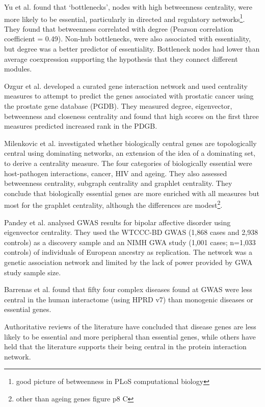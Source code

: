 Yu et al.\cite{yu2007importance} found that `bottlenecks', nodes with high betweenness centrality, were more likely to be essential, particularly in directed and regulatory networks\footnote{good picture of betweenness in PLoS computational biology}. They found that betweenness correlated with degree (Pearson correlation coefficient = 0.49). Non-hub bottlenecks,  were also associated with essentiality, but degree was a better predictor of essentiality. Bottleneck nodes had lower than average coexpression supporting the hypothesis that they connect different modules.

Ozgur et al.\cite{ozgur2008identifying} developed a curated gene interaction network and used centrality measures to attempt to predict the genes associated with prostatic cancer using the prostate gene database (PGDB). They measured degree, eigenvector, betweenness and closeness centrality and found that high scores on the first three measures predicted increased rank in the PDGB.

Milenkovic et al.\cite{milenkovic2011dominating} investigated whether biologically central genes are topologically central using dominating networks, an extension of the idea of a dominating set, to derive a centrality measure. The four categories of biologically essential were host-pathogen interactions, cancer, HIV and ageing. They also assessed betweenness centrality, subgraph centrality and graphlet centrality. They conclude that biologically essential genes are more enriched with all measures but most for the graphlet centrality, although the differences are modest\footnote{other than ageing genes figure p8 C}.  

Pandey et al.\cite{pandey2012epistasis} analysed GWAS results for bipolar affective disorder using eigenvector centrality. They used the WTCCC-BD GWAS (1,868 cases and 2,938 controls) as a discovery sample and an NIMH GWA study (1,001 cases; n=1,033 controls) of individuals of European ancestry as replication. The network was a genetic association network and limited by the lack of power provided by GWA study sample size.

Barrenas et al. \cite{barrenas2009network} found that fifty four complex diseases found at GWAS\cite{hindorff2009potential} were less central in the human interactome (using HPRD v7\cite{keshava2009human}) than monogenic diseases or essential genes. 

Authoritative reviews of the literature have concluded that disease genes are less likely to be essential\cite{barabasi2011network} and more peripheral than essential genes, while others have held that the literature supports their being central in the protein interaction network\cite{ideker2008protein}.


